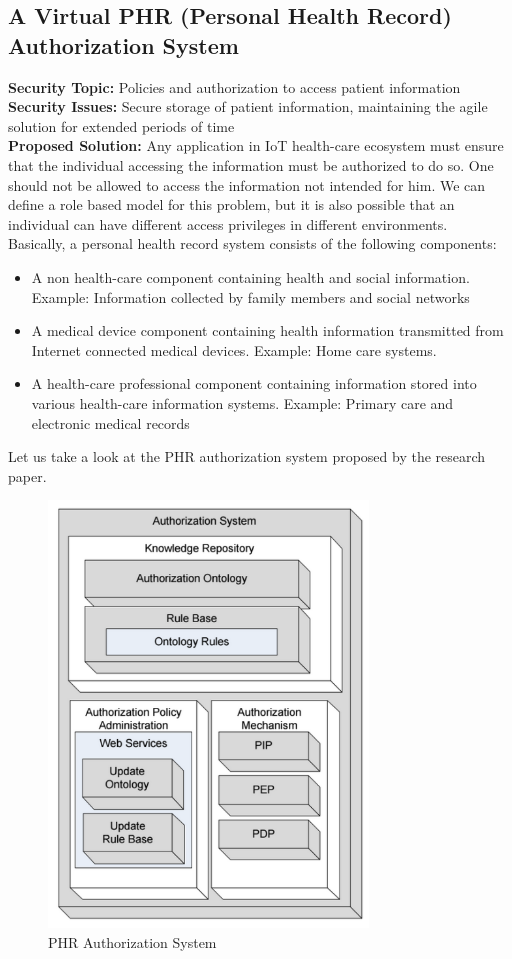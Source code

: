 \documentclass[letterpaper, 10 pt, conference]{ieeeconf}  %
\begin{document}
\subsection{A Virtual PHR (Personal Health Record) Authorization System\cite{phr}}
\noindent \textbf{Security Topic:} Policies and authorization to access patient information\\
\textbf{Security Issues:} Secure storage of patient information, maintaining the agile solution for extended periods of time\\
\textbf{Proposed Solution:} 
Any application in IoT health-care ecosystem must ensure that the individual accessing the information must be authorized to do so. One should not be allowed to access the information not intended for him. We can define a role based model for this problem, but it is also possible that an individual can have different access privileges in different environments.\\
Basically, a personal health record system consists of the following components:
\begin{itemize}
\item A non health-care component containing health and social information. Example: Information collected by family members and social networks
\item A medical device component containing health information transmitted from Internet connected medical devices. Example: Home care systems.
\item A health-care professional component containing information stored into various health-care information systems. Example: Primary care and electronic medical records
\end{itemize}
Let us take a look at the PHR authorization system proposed by the research paper.
\begin{figure}[!ht]
\centering
\includegraphics[width= 8.5cm]{fig2.png}
\caption{PHR Authorization System}
\end{figure}
\end{document}
